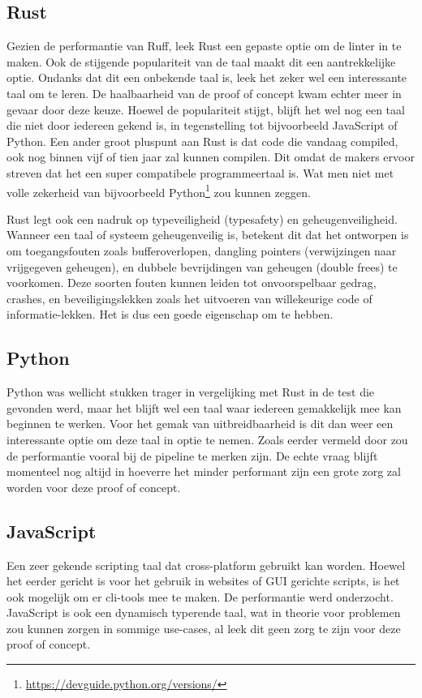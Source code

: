 \subsection{Rust}
Gezien de performantie van Ruff, leek Rust een gepaste optie om de linter in te maken. Ook de stijgende populariteit van de taal maakt dit een aantrekkelijke optie. Ondanks dat dit een onbekende taal is, leek het zeker wel een interessante taal om te leren. De haalbaarheid van de proof of concept kwam echter meer in gevaar door deze keuze. Hoewel de populariteit stijgt, blijft het wel nog een taal die niet door iedereen gekend is, in tegenstelling tot bijvoorbeeld JavaScript of Python. Een ander groot pluspunt aan Rust is dat code die vandaag compiled, ook nog binnen vijf of tien jaar zal kunnen compilen. Dit omdat de makers ervoor streven dat het een super compatibele programmeertaal is. Wat men niet met volle zekerheid van bijvoorbeeld Python\footnote{\url{https://devguide.python.org/versions/}} zou kunnen zeggen. 
 
Rust legt ook een nadruk op typeveiligheid (typesafety) en geheugenveiligheid. Wanneer een taal of systeem geheugenveilig is, betekent dit dat het ontworpen is om toegangsfouten zoals bufferoverlopen, dangling pointers (verwijzingen naar vrijgegeven geheugen), en dubbele bevrijdingen van geheugen (double frees) te voorkomen. Deze soorten fouten kunnen leiden tot onvoorspelbaar gedrag, crashes, en beveiligingslekken zoals het uitvoeren van willekeurige code of informatie-lekken. Het is dus een goede eigenschap om te hebben.\autocite{Klabnik2022}

\subsection{Python}
Python was wellicht stukken trager in vergelijking met Rust in de test die gevonden werd, maar het blijft wel een taal waar iedereen gemakkelijk mee kan beginnen te werken. Voor het gemak van uitbreidbaarheid is dit dan weer een interessante optie om deze taal in optie te nemen. Zoals eerder vermeld door \textcite{TurnerTrauring2023} zou de performantie vooral bij de pipeline te merken zijn.
De echte vraag blijft momenteel nog altijd in hoeverre het minder performant zijn een grote zorg zal worden voor deze proof of concept.

\subsection{JavaScript}
Een zeer gekende scripting taal dat cross-platform gebruikt kan worden. Hoewel het eerder gericht is voor het gebruik in websites of GUI gerichte scripts, is het ook mogelijk om er cli-tools mee te maken. De performantie werd onderzocht. JavaScript is ook een dynamisch typerende taal, wat in theorie voor problemen zou kunnen zorgen in sommige use-cases, al leek dit geen zorg te zijn voor deze proof of concept.\autocite{MDN2024}

